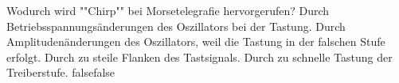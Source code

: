     {Wodurch wird ""Chirp"" bei Morsetelegrafie hervorgerufen?}
    {Durch Betriebsspannungsänderungen des Oszillators bei der Tastung.}
    {Durch Amplitudenänderungen des Oszillators, weil die Tastung in der falschen Stufe erfolgt.}
    {Durch zu steile Flanken des Tastsignals.}
    {Durch zu schnelle Tastung der Treiberstufe.}
    {false}{false}